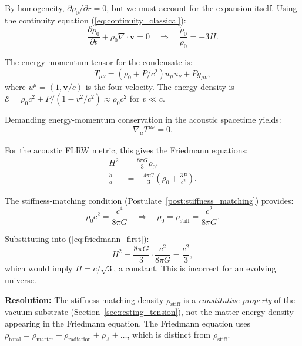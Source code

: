 \documentclass[11pt,a4paper]{article}
\newcommand{\rhostiff}{\ensuremath{\rho_{\mathrm{stiff}}}}
\theoremstyle{definition}
\theoremstyle{remark}
\begin{document}
By homogeneity, $\partial\rho_0/\partial r = 0$, but we must account for the expansion itself. Using the continuity equation (\ref{eq:continuity_classical}):
\begin{equation}
\frac{\partial\rho_0}{\partial t} + \rho_0 \nabla \cdot \mathbf{v} = 0 \quad \Rightarrow \quad \frac{\dot{\rho}_0}{\rho_0} = -3H.
\end{equation}

The energy-momentum tensor for the condensate is:
\begin{equation}
T_{\mu\nu} = (\rho_0 + P/c^2)u_\mu u_\nu + P g_{\mu\nu},
\end{equation}
where $u^\mu = (1, \mathbf{v}/c)$ is the four-velocity. The energy density is $\mathcal{E} = \rho_0 c^2 + P/(1-v^2/c^2) \approx \rho_0 c^2$ for $v \ll c$.

Demanding energy-momentum conservation in the acoustic spacetime yields:
\begin{equation}
\nabla_\mu T^{\mu\nu} = 0.
\end{equation}

For the acoustic FLRW metric, this gives the Friedmann equations:
\begin{align}
H^2 &= \frac{8\pi G}{3}\rho_0, \label{eq:friedmann_first} \\
\frac{\ddot{a}}{a} &= -\frac{4\pi G}{3}\left(\rho_0 + \frac{3P}{c^2}\right). \label{eq:friedmann_second}
\end{align}

The stiffness-matching condition (Postulate~\ref{post:stiffness_matching}) provides:
\begin{equation}
\label{eq:stiffness_condition}
\rho_0 c^2 = \frac{c^4}{8\pi G} \quad \Rightarrow \quad \rho_0 = \rhostiff = \frac{c^2}{8\pi G}.
\end{equation}

Substituting into (\ref{eq:friedmann_first}):
\begin{equation}
H^2 = \frac{8\pi G}{3}\cdot\frac{c^2}{8\pi G} = \frac{c^2}{3},
\end{equation}
which would imply $H = c/\sqrt{3}$, a constant. This is incorrect for an evolving universe.

\textbf{Resolution:} The stiffness-matching density $\rhostiff$ is a \emph{constitutive property} of the vacuum substrate (Section~\ref{sec:resting_tension}), not the matter-energy density appearing in the Friedmann equation. The Friedmann equation uses $\rho_{\mathrm{total}} = \rho_{\mathrm{matter}} + \rho_{\mathrm{radiation}} + \rho_\Lambda + \dots$, which is distinct from $\rhostiff$.
\end{document}
